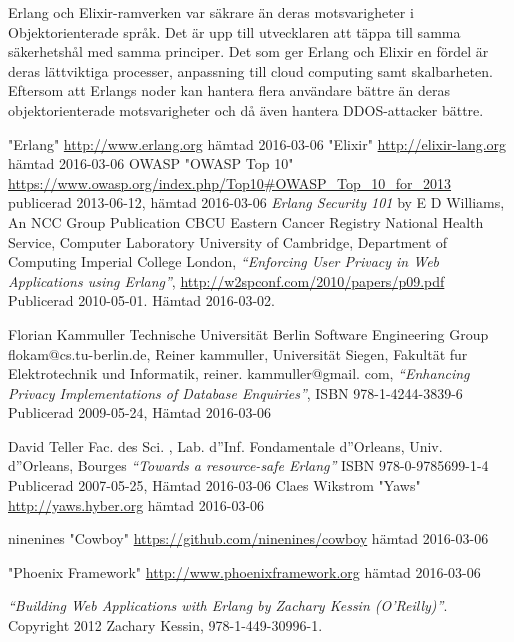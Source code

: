 \documentclass[12pt]{article}
\begin{document}
Erlang och Elixir-ramverken var säkrare än deras motsvarigheter i Objektorienterade språk. 
Det är upp till utvecklaren att täppa till samma säkerhetshål med samma principer. 
Det som ger Erlang och Elixir en fördel är deras lättviktiga processer, anpassning till cloud computing samt skalbarheten. Eftersom att Erlangs noder  
kan hantera flera användare bättre än deras objektorienterade motsvarigheter och då även hantera DDOS-attacker bättre.

	
\begin{thebibliography}{99}
	
	"Erlang" \url{http://www.erlang.org}
hämtad 2016-03-06
"Elixir" \url{http://elixir-lang.org}
hämtad 2016-03-06
 OWASP "OWASP Top 10" \url{https://www.owasp.org/index.php/Top10#OWASP_Top_10_for_2013}
publicerad 2013-06-12,
hämtad 2016-03-06
     {\em Erlang Security 101} by E D Williams, An NCC Group Publication
 CBCU Eastern Cancer Registry National Health Service, Computer Laboratory University of Cambridge, Department of Computing Imperial College London, {\em “Enforcing User Privacy in Web Applications using Erlang”}, \url{http://w2spconf.com/2010/papers/p09.pdf} Publicerad 2010-05-01.
 Hämtad 2016-03-02.
				
Florian Kammuller Technische Universität Berlin Software Engineering Group flokam@cs.tu-berlin.de, Reiner kammuller, Universität Siegen, Fakultät fur Elektrotechnik und Informatik, reiner.
kammuller@gmail.
com, {\em “Enhancing Privacy Implementations of Database Enquiries”}, ISBN 978-1-4244-3839-6 Publicerad 2009-05-24, Hämtad 2016-03-06

David Teller Fac.
 des Sci.
, Lab.
 d''Inf.
 Fondamentale d''Orleans, Univ.
 d''Orleans, Bourges {\em “Towards a resource-safe Erlang”} ISBN 978-0-9785699-1-4 Publicerad 2007-05-25, Hämtad 2016-03-06			
     Claes Wikstrom "Yaws" \url{http://yaws.hyber.org}
hämtad 2016-03-06

ninenines "Cowboy" \url{https://github.com/ninenines/cowboy}
hämtad 2016-03-06


  "Phoenix Framework" \url{http://www.phoenixframework.org}
hämtad 2016-03-06


 {\em “Building Web Applications with Erlang by Zachary Kessin (O’Reilly)”}.
 Copyright 2012 Zachary Kessin, 978-1-449-30996-1.


\end{thebibliography}
\end{document}
